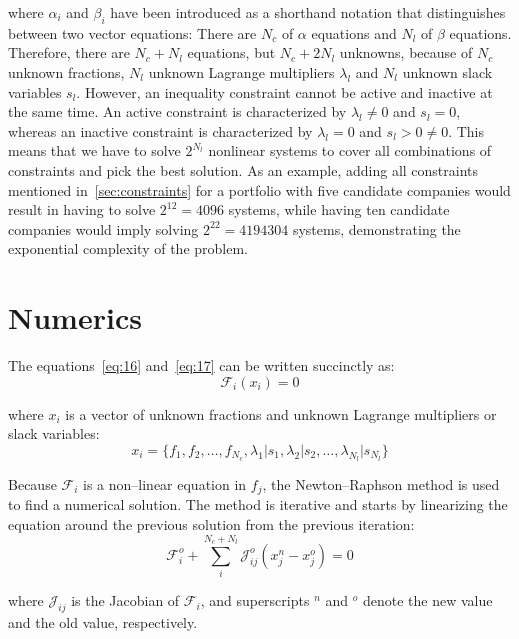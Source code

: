 \documentclass{article}
\begin{document}
\noindent where $\alpha_i$ and $\beta_i$ have been introduced as a shorthand
notation that distinguishes between two vector equations: There are $N_c$
of $\alpha$ equations and $N_l$ of $\beta$ equations. Therefore, there are
$N_c + N_l$ equations, but $N_c + 2N_l$ unknowns, because of $N_c$ unknown
fractions, $N_l$ unknown Lagrange multipliers $\lambda_l$ and $N_l$ unknown
slack variables $s_l$. However, an inequality constraint cannot be active and
inactive at the same time. An active constraint is characterized by $\lambda_l
\neq 0$ and $s_l = 0$, whereas an inactive constraint is characterized by
$\lambda_l = 0$ and $s_l > 0 \ne 0$. This means that we have to solve $2^{N_l}$
nonlinear systems to cover all combinations of constraints and pick the best
solution. As an example, adding all constraints mentioned
in~\autoref{sec:constraints} for a portfolio with five candidate companies would
result in having to solve $2^{12} = 4 096$ systems, while having ten candidate
companies would imply solving $2^{22} = 4 194 304$ systems, demonstrating the
exponential complexity of the problem.


\section{Numerics}
\label{sec:numerics}

\noindent The equations~\eqref{eq:16} and~\eqref{eq:17} can be written
succinctly as:
\begin{equation}
\label{eq:18}
    \mathcal{F}_i(x_i) = 0
\end{equation}

\noindent where $x_i$ is a vector of unknown fractions and unknown Lagrange
multipliers or slack variables:
\begin{equation}
\label{eq:19}
    x_i
  =
    \{ f_1, f_2, \ldots, f_{N_c}, \lambda_1 | s_1, \lambda_2 | s_2,
    \ldots, \lambda_{N_l} | s_{N_l} \}
\end{equation}

\indent Because $\mathcal{F}_i$ is a non--linear equation in $f_j$,
the Newton--Raphson method is used to find a numerical solution. The method is
iterative and starts by linearizing the equation around the previous solution
from the previous iteration:
\begin{equation}
\label{eq:20}
    \mathcal{F}_i^o + \sum_{i}^{N_c + N_l} \mathcal{J}_{ij}^o (x_j^n - x_j^o) = 0
\end{equation}

\noindent where $\mathcal{J}_{ij}$ is the Jacobian of $\mathcal{F}_i$, and
superscripts $^n$ and $^o$ denote the new value and the old value, respectively.
\end{document}
